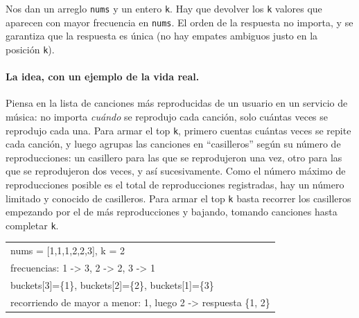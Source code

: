 
Nos dan un arreglo \texttt{nums} y un entero \texttt{k}. Hay que devolver los
\texttt{k} valores que aparecen con mayor frecuencia en \texttt{nums}. El
orden de la respuesta no importa, y se garantiza que la respuesta es única
(no hay empates ambiguos justo en la posición \texttt{k}).

\paragraph{La idea, con un ejemplo de la vida real.} Piensa en la lista de
canciones más reproducidas de un usuario en un servicio de música: no
importa \emph{cuándo} se reprodujo cada canción, solo cuántas veces se
reprodujo cada una. Para armar el top \texttt{k}, primero cuentas cuántas
veces se repite cada canción, y luego agrupas las canciones en
``casilleros'' según su número de reproducciones: un casillero para las que
se reprodujeron una vez, otro para las que se reprodujeron dos veces, y así
sucesivamente. Como el número máximo de reproducciones posible es el total
de reproducciones registradas, hay un número limitado y conocido de
casilleros. Para armar el top \texttt{k} basta recorrer los casilleros
empezando por el de más reproducciones y bajando, tomando canciones hasta
completar \texttt{k}.

\begin{center}
\ttfamily
\begin{tabular}{l}
nums = [1,1,1,2,2,3], k = 2\\
frecuencias: 1 -> 3, 2 -> 2, 3 -> 1\\
buckets[3]=\{1\}, buckets[2]=\{2\}, buckets[1]=\{3\}\\
recorriendo de mayor a menor: 1, luego 2 -> respuesta \{1, 2\}\\
\end{tabular}
\end{center}

